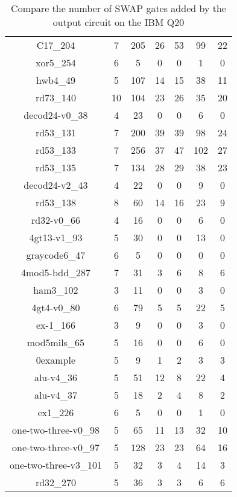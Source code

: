 \documentclass[runningheads]{llncs}
\begin{document}
\begin{table}[H]
\begin{center}
\begin{tabular}{|c|c|c|c|c|c|c|}
C17\_204 & 7 & 205 & 26 & 53 & 99 & 22 \\ 
xor5\_254 & 6 & 5 & 0 & 0 & 1 & 0 \\ 
hwb4\_49 & 5 & 107 & 14 & 15 & 38 & 11 \\ 
rd73\_140 & 10 & 104 & 23 & 26 & 35 & 20 \\ 
decod24-v0\_38 & 4 & 23 & 0 & 0 & 6 & 0 \\ 
rd53\_131 & 7 & 200 & 39 & 39 & 98 & 24 \\ 
rd53\_133 & 7 & 256 & 37 & 47 & 102 & 27 \\ 
rd53\_135 & 7 & 134 & 28 & 29 & 38 & 23 \\ 
decod24-v2\_43 & 4 & 22 & 0 & 0 & 9 & 0 \\ 
rd53\_138 & 8 & 60 & 14 & 16 & 23 & 9 \\ 
rd32-v0\_66 & 4 & 16 & 0 & 0 & 6 & 0 \\ 
4gt13-v1\_93 & 5 & 30 & 0 & 0 & 13 & 0 \\ 
graycode6\_47 & 6 & 5 & 0 & 0 & 0 & 0 \\ 
4mod5-bdd\_287 & 7 & 31 & 3 & 6 & 8 & 6 \\ 
ham3\_102 & 3 & 11 & 0 & 0 & 3 & 0 \\ 
4gt4-v0\_80 & 6 & 79 & 5 & 5 & 22 & 5 \\ 
ex-1\_166 & 3 & 9 & 0 & 0 & 3 & 0 \\ 
mod5mils\_65 & 5 & 16 & 0 & 0 & 6 & 0 \\ 
0example & 5 & 9 & 1 & 2 & 3 & 3 \\ 
alu-v4\_36 & 5 & 51 & 12 & 8 & 22 & 4 \\ 
alu-v4\_37 & 5 & 18 & 2 & 4 & 8 & 2 \\ 
ex1\_226 & 6 & 5 & 0 & 0 & 1 & 0 \\ 
one-two-three-v0\_98 & 5 & 65 & 11 & 13 & 32 & 10 \\ 
one-two-three-v0\_97 & 5 & 128 & 23 & 23 & 64 & 16 \\ 
one-two-three-v3\_101 & 5 & 32 & 3 & 4 & 14 & 3 \\ 
rd32\_270 & 5 & 36 & 3 & 3 & 6 & 6 \\
\hline
	\end{tabular} 
	\end{center}
	\caption{Compare the number of SWAP gates added by the 
	output circuit on the IBM Q20 } 
	\label{tab2}
	\end{table}
\end{document}
